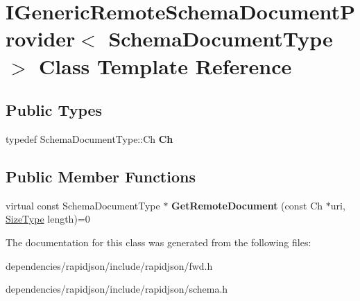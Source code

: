 \hypertarget{class_i_generic_remote_schema_document_provider}{}\section{I\+Generic\+Remote\+Schema\+Document\+Provider$<$ Schema\+Document\+Type $>$ Class Template Reference}
\label{class_i_generic_remote_schema_document_provider}
\subsection*{Public Types}
\begin{DoxyCompactItemize}
\item 
\mbox{\label{class_i_generic_remote_schema_document_provider_acfcd5492c3df8ff56cd2d84d36cc0ceb}} 
typedef Schema\+Document\+Type\+::\+Ch {\bfseries Ch}
\end{DoxyCompactItemize}
\subsection*{Public Member Functions}
\begin{DoxyCompactItemize}
\item 
\mbox{\label{class_i_generic_remote_schema_document_provider_aad112a069dd57fe850fafd04cbb4777b}} 
virtual const Schema\+Document\+Type $\ast$ {\bfseries Get\+Remote\+Document} (const Ch $\ast$uri, \hyperlink{rapidjson_8h_a5ed6e6e67250fadbd041127e6386dcb5}{Size\+Type} length)=0
\end{DoxyCompactItemize}


The documentation for this class was generated from the following files\+:\begin{DoxyCompactItemize}
\item 
dependencies/rapidjson/include/rapidjson/fwd.\+h\item 
dependencies/rapidjson/include/rapidjson/schema.\+h\end{DoxyCompactItemize}
